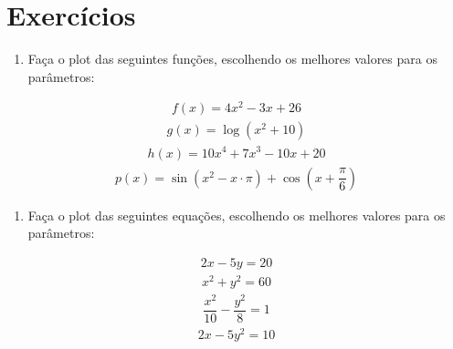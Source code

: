 \documentclass[letterpaper,10pt,english]{jupyterBook}
\begin{document}
\section{Exercícios}
\label{\detokenize{chapters/5:exercicios}}\begin{enumerate}
%
\item {} 
\sphinxAtStartPar
Faça o plot das seguintes funções, escolhendo os melhores valores para os parâmetros:

\end{enumerate}
\begin{equation*}
\begin{split}f(x) = 4x^2 - 3x + 26\end{split}
\end{equation*}\begin{equation*}
\begin{split}g(x) = \log(x^2 + 10)\end{split}
\end{equation*}\begin{equation*}
\begin{split}h(x) = 10x^4 + 7x^3 - 10x + 20\end{split}
\end{equation*}\begin{equation*}
\begin{split}p(x) = \sin(x^2 - x\cdot \pi) + \cos\left(x + \dfrac{\pi}{6}\right)\end{split}
\end{equation*}\begin{enumerate}
%
\item {} 
\sphinxAtStartPar
Faça o plot das seguintes equações, escolhendo os melhores valores para os parâmetros:

\end{enumerate}
\begin{equation*}
\begin{split} 2x - 5y = 20\end{split}
\end{equation*}\begin{equation*}
\begin{split}x^2 + y^2 = 60\end{split}
\end{equation*}\begin{equation*}
\begin{split}\dfrac{x^2}{10} - \dfrac{y^2}{8} = 1\end{split}
\end{equation*}\begin{equation*}
\begin{split}2x - 5y^2 = 10\end{split}
\end{equation*}
\end{document}
